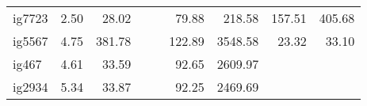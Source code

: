 \begin{longtable}{l|rr|rr|rr|rr}
ig7723 & 2.50 & 28.02 &  &  & 79.88 & 218.58 & 157.51 & 405.68 \\
ig5567 & 4.75 & 381.78 &  &  & 122.89 & 3548.58 & 23.32 & 33.10 \\
ig467 & 4.61 & 33.59 &  &  & 92.65 & 2609.97 &  &  \\
ig2934 & 5.34 & 33.87 &  &  & 92.25 & 2469.69 &  &  \\
\end{longtable}
